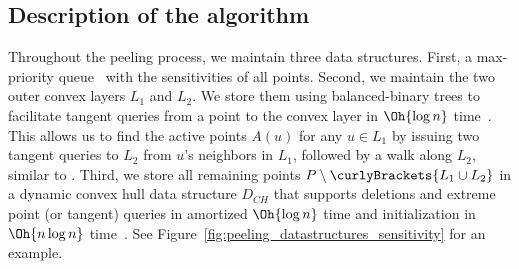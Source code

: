 \subsection{Description of the algorithm}
Throughout the peeling process, we maintain three data structures. 
First, a max-priority queue~\cite{williams1964algorithm} with the sensitivities of all points. 
Second, we maintain the two outer convex layers $L_1$ and $L_2$. 
We store them using balanced-binary trees to facilitate tangent queries from a point to the convex layer in $\Oh{\log n}$ time~\cite{1995_kirkpatrick_Snoeyink_tangents_without_separating_line, 1981_overmars_maintenance_2D_convex_hull_tangent_with_seprating_line}. 
This allows us to find the active points $A(u)$ for any $u \in L_1$ by issuing two tangent queries to $L_2$ from $u$’s neighbors in $L_1$, followed by a walk along $L_2$, similar to \cite{loffler2014unions}. 
Third, we store all remaining points $P \setminus \curlyBrackets{L_1 \cup L_2}$ in a dynamic convex hull data structure $D_{CH}$ that supports deletions and extreme point (or tangent) queries in amortized $\Oh{\log n}$ time and initialization in $\Oh{n \log n}$ time~\cite{1992_hershberger_semi_dynamic_CH, 2002_brodal_rico_dynamic_CH}. 
See Figure~\ref{fig:peeling_datastructures_sensitivity} for an example. 

